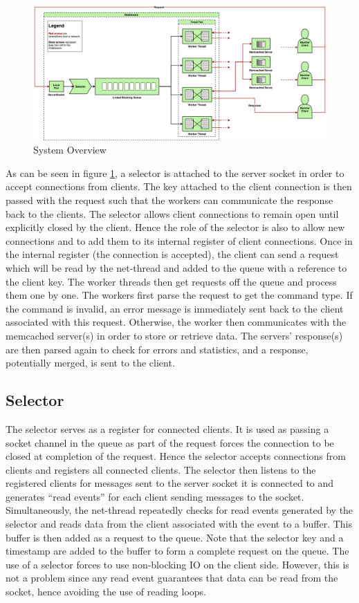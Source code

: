\documentclass[11pt,a4paper]{article}
\begin{document}
\begin{figure}[h]
    \centering
    \includegraphics[width=\textwidth]{processing/graphics/system_overview.png}
    \caption{System Overview}
    \label{png::system_overview}
\end{figure}

As can be seen in figure \ref{png::system_overview}, a selector is attached to the server socket in order to accept connections from clients. The key attached to the client connection is then passed with the request such that the workers can communicate the response back to the clients. The selector allows client connections to remain open until explicitly closed by the client. Hence the role of the selector is also to allow new connections and to add them to its internal register of client connections. Once in the internal register (the connection is accepted), the client can send a request which will be read by the net-thread and added to the queue with a reference to the client key. The worker threads then get requests off the queue and process them one by one. The workers first parse the request to get the command type. If the command is invalid, an error message is immediately sent back to the client associated with this request. Otherwise, the worker then communicates with the memcached server(s) in order to store or retrieve data. The servers' response(s) are then parsed again to check for errors and statistics, and a response, potentially merged, is sent to the client.

\subsection{Selector}
The selector serves as a register for connected clients. It is used as passing a socket channel in the queue as part of the request forces the connection to be closed at completion of the request. Hence the selector accepts connections from clients and registers all connected clients. The selector then listens to the registered clients for messages sent to the server socket it is connected to and generates ``read events'' for each client sending messages to the socket. Simultaneously, the net-thread repeatedly checks for read events generated by the selector and reads data from the client associated with the event to a buffer. This buffer is then added as a request to the queue. Note that the selector key and a timestamp are added to the buffer to form a complete request on the queue. The use of a selector forces to use non-blocking IO on the client side. However, this is not a problem since any read event guarantees that data can be read from the socket, hence avoiding the use of reading loops.
\end{document}
